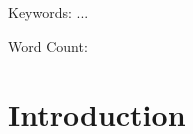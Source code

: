 \documentclass[letterpaper,10pt,times,preprint]{elsarticle}
\begin{document}
\begin{frontmatter}
    \title{\huge{{}}}
    \author{\large{}$^a$ }
    \address{$^a$Department of Materials Science and Engineering, Texas A\&M University, College Station, TX 77843, USA}
    \address{$^b$Department of Industrial and Systems Engineering, Texas A\&M University, College Station, TX 77843, USA}
    \date{02/10/2025}

    \begin{abstract}
    xxxx
    \end{abstract}

    \begin{keyword}
    Keywords: ...
    \end{keyword}

\end{frontmatter}

Word Count: 



\section{Introduction}
\end{document}
